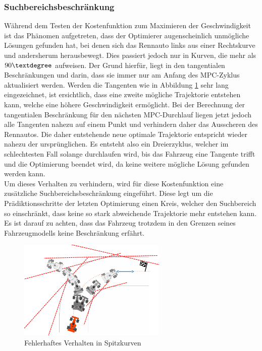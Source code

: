 \documentclass{like}
\begin{document}
\subsubsection*{Suchbereichsbeschränkung}
Während dem Testen der Kostenfunktion zum Maximieren der Geschwindigkeit ist das Phänomen aufgetreten, dass der Optimierer augenscheinlich unmögliche Lösungen gefunden hat, bei denen sich das Rennauto links aus einer Rechtskurve und andersherum herausbewegt. Dies passiert jedoch nur in Kurven, die mehr als $90 \textdegree$ aufweisen. Der Grund hierfür, liegt in den tangentialen Beschränkungen und darin, dass sie immer nur am Anfang des \ac{MPC}-Zyklus aktualisiert werden. Werden die Tangenten wie in Abbildung \ref{fig:curveAnomaly} sehr lang eingezeichnet, ist ersichtlich, dass eine zweite mögliche Trajektorie entstehen kann, welche eine höhere Geschwindigkeit ermöglicht. Bei der Berechnung der tangentialen Beschränkung für den nächsten \ac{MPC}-Durchlauf liegen jetzt jedoch alle Tangenten nahezu auf einem Punkt und verhindern daher das Ausscheren des Rennautos. Die daher entstehende neue optimale Trajektorie entspricht wieder nahezu der ursprünglichen. Es entsteht also ein Dreierzyklus, welcher im schlechtesten Fall solange durchlaufen wird, bis das Fahrzeug eine Tangente trifft und die Optimierung beendet wird, da keine weitere mögliche Lösung gefunden werden kann.\\
Um dieses Verhalten zu verhindern, wird für diese Kostenfunktion eine zusätzliche Suchbereichsbeschränkung eingeführt. Diese legt um die Prädiktionsschritte der letzten Optimierung einen Kreis, welcher den Suchbereich so einschränkt, dass keine so stark abweichende Trajektorie mehr entstehen kann. Es ist darauf zu achten, dass das Fahrzeug trotzdem in den Grenzen seines Fahrzeugmodells keine Beschränkung erfährt. 


\begin{figure}[ht!]
	\centering
	\includegraphics[width=200pt]{Abbildungen/curveAnomaly.png}
	\caption{Fehlerhaftes Verhalten in Spitzkurven}
	\label{fig:curveAnomaly}
\end{figure}
\end{document}
